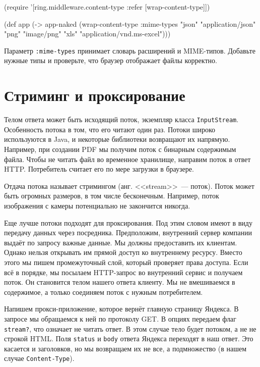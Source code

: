 \begin{english}
  \begin{clojure}
(require '[ring.middleware.content-type
           :refer [wrap-content-type]])

(def app
  (-> app-naked
      (wrap-content-type
       {:mime-types {"json" "application/json"
                      "png" "image/png"
                      "xls" "application/vnd.ms-excel"}})))
  \end{clojure}
\end{english}

Параметр \verb|:mime-types| принимает словарь расширений и
MIME-типов. Добавьте нужные типы и
проверьте, что браузер отображает файлы корректно.


\section{Стриминг и проксирование}

Телом ответа может быть исходящий поток, экземпляр класса
\verb|InputStream|. Особенность потока в том, что его читают один раз. Потоки
широко используются в Java, и некоторые библиотеки возвращают их
напрямую. Например, при создании PDF мы получим поток с бинарным содержимым
файла. Чтобы не читать файл во временное хранилище, направим поток в ответ
HTTP. Потребитель считает его по мере загрузки в браузере.

Отдача потока называет стримингом (анг. <<stream>>~--- поток). Поток может быть
огромных размеров, в том числе бесконечным. Например, поток изображения с камеры
потенциально не закончится никогда.

Еще лучше потоки подходят для проксирования. Под этим словом имеют в виду
передачу данных через посредника. Предположим, внутренний сервер компании
выдаёт по запросу важные данные. Мы должны предоставить их клиентам. Однако
нельзя открывать им прямой доступ ко внутреннему ресурсу. Вместо этого мы пишем
промежуточный слой, который проверяет права доступа. Если всё в порядке, мы
посылаем HTTP-запрос во внутренний сервис и получаем поток. Он становится телом
нашего ответа клиенту. Мы не вмешиваемся в содержимое, а только соединяем поток с
нужным потребителем.

Напишем прокси-приложение, которое вернёт главную страницу Яндекса. В
запросе мы обращаемся к ней по протоколу GET. В опциях передаем флаг
\verb|stream?|, что означает не читать ответ. В этом случае тело будет
потоком, а не не строкой HTML. Поля \verb|status| и \verb|body| ответа
Яндекса переходят в наш ответ. Это касается и заголовков, но мы возвращаем их не
все, а подмножество (в нашем случае \verb|Content-Type|).

